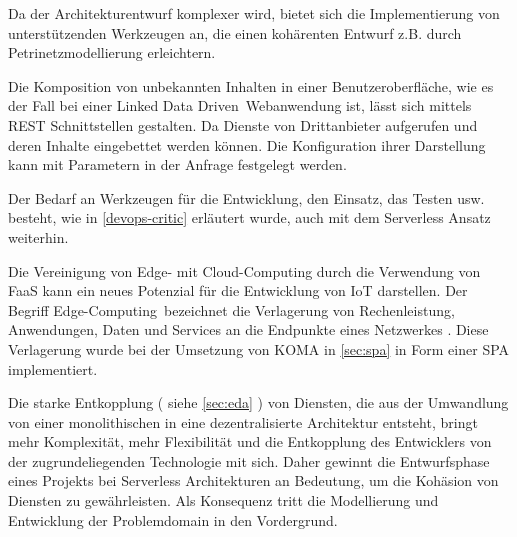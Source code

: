 \documentclass[
12pt,
english,
ngerman,
headsepline,
twoside,
openright,
numbers=noenddot,version=first
]{scrreprt}
\begin{document}
Da der Architekturentwurf komplexer wird, bietet sich die Implementierung von unterstützenden Werkzeugen an, die einen kohärenten Entwurf z.B. durch Petrinetzmodellierung erleichtern.


Die Komposition von unbekannten Inhalten in einer Benutzeroberfläche, wie es der Fall bei einer \glqq Linked Data Driven\grqq\ Webanwendung ist, lässt sich mittels \acrshort{REST} Schnittstellen gestalten. Da Dienste von Drittanbieter aufgerufen und deren Inhalte eingebettet werden können. Die Konfiguration ihrer Darstellung kann mit Parametern in der Anfrage festgelegt werden.


Der Bedarf an Werkzeugen für die Entwicklung, den Einsatz, das Testen usw. besteht, wie in \ref{devops-critic} erläutert wurde, auch mit dem Serverless Ansatz weiterhin.


Die Vereinigung von Edge- mit Cloud-Computing durch die Verwendung von \acrshort{FaaS} kann ein neues Potenzial für die Entwicklung von IoT darstellen. Der Begriff \glqq Edge-Computing\grqq\ bezeichnet die Verlagerung von Rechenleistung, Anwendungen, Daten und Services an die Endpunkte eines Netzwerkes \cite{edge}. Diese Verlagerung wurde bei der Umsetzung von \acrshort{KOMA} in \autoref{sec:spa} in Form einer \acrshort{SPA} implementiert. 




Die starke Entkopplung ( siehe \autoref{sec:eda} ) von Diensten, die aus der Umwandlung von einer monolithischen in eine dezentralisierte Architektur entsteht, bringt mehr Komplexität, mehr Flexibilität und die Entkopplung des Entwicklers von der zugrundeliegenden Technologie mit sich. Daher gewinnt die Entwurfsphase eines Projekts bei Serverless Architekturen an Bedeutung, um die Kohäsion von Diensten zu gewährleisten. Als Konsequenz tritt die Modellierung und Entwicklung der Problemdomain in den Vordergrund.
\end{document}
